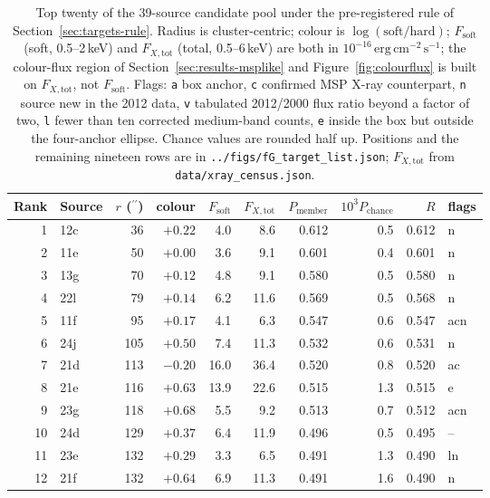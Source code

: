 \documentclass[11pt]{article}
\newcommand{\as}{\ensuremath{^{\prime\prime}}}
\newcommand{\pchance}{\ensuremath{P_{\mathrm{chance}}}}
\begin{document}
\begin{table}[tbp]
\centering
\small
\caption{Top twenty of the 39-source candidate pool under the pre-registered rule
of Section~\ref{sec:targets-rule}. Radius is cluster-centric; colour is
$\log(\mathrm{soft}/\mathrm{hard})$; $F_{\mathrm{soft}}$ (soft, 0.5--2\,keV) and
$F_{X,\mathrm{tot}}$ (total, 0.5--6\,keV) are both in
$10^{-16}\,\mathrm{erg\,cm^{-2}\,s^{-1}}$; the colour-flux region of
Section~\ref{sec:results-msplike} and Figure~\ref{fig:colourflux} is built on
$F_{X,\mathrm{tot}}$, not $F_{\mathrm{soft}}$. Flags: \texttt{a} box anchor,
\texttt{c} confirmed MSP X-ray counterpart, \texttt{n} source new in the 2012 data,
\texttt{v} tabulated 2012/2000 flux ratio beyond a factor of two, \texttt{l} fewer
than ten corrected medium-band counts, \texttt{e} inside the box but outside the
four-anchor ellipse. Chance values are rounded half up. Positions and the remaining nineteen rows are in
\texttt{../figs/fG\_target\_list.json}; $F_{X,\mathrm{tot}}$ from
\texttt{data/xray\_census.json}.}
\label{tab:targets}
\begin{tabular}{rlrrrrrrrl}
\toprule
Rank & Source & $r$ (\as) & colour & $F_{\mathrm{soft}}$ & $F_{X,\mathrm{tot}}$ & $P_{\mathrm{member}}$ & $10^{3}\pchance{}$ & $R$ & flags \\
\midrule
1 & 12c & 36 & $+0.22$ & 4.0 & 8.6 & 0.612 & 0.5 & 0.612 & n \\
2 & 11e & 50 & $+0.00$ & 3.6 & 9.1 & 0.601 & 0.4 & 0.601 & n \\
3 & 13g & 70 & $+0.12$ & 4.8 & 9.1 & 0.580 & 0.5 & 0.580 & n \\
4 & 22l & 79 & $+0.14$ & 6.2 & 11.6 & 0.569 & 0.5 & 0.568 & n \\
5 & 11f & 95 & $+0.17$ & 4.1 & 6.3 & 0.547 & 0.6 & 0.547 & acn \\
6 & 24j & 105 & $+0.50$ & 7.4 & 11.3 & 0.532 & 0.6 & 0.531 & n \\
7 & 21d & 113 & $-0.20$ & 16.0 & 36.4 & 0.520 & 0.8 & 0.520 & ac \\
8 & 21e & 116 & $+0.63$ & 13.9 & 22.6 & 0.515 & 1.3 & 0.515 & e \\
9 & 23g & 118 & $+0.68$ & 5.5 & 9.2 & 0.513 & 0.7 & 0.512 & acn \\
10 & 24d & 129 & $+0.37$ & 6.4 & 11.9 & 0.496 & 0.5 & 0.495 & -- \\
11 & 23e & 132 & $+0.29$ & 3.3 & 6.5 & 0.491 & 1.3 & 0.490 & ln \\
12 & 21f & 132 & $+0.64$ & 6.9 & 11.3 & 0.491 & 1.6 & 0.490 & n \\

\end{tabular}
\end{table}
\end{document}
